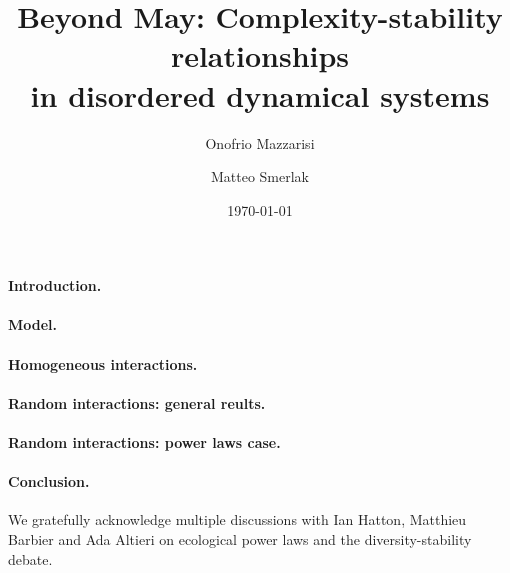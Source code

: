 \documentclass[
 prl,
 twocolumn,
 amsmath,
 amssymb,
 aps,
]{revtex4-2}
\begin{document}
\title{Beyond May: Complexity-stability relationships \\
in disordered dynamical systems}

\author{Onofrio Mazzarisi}

\author{Matteo Smerlak}


\date{\today}

\begin{abstract}

\end{abstract}
\maketitle

\paragraph*{\bf Introduction.}


\paragraph*{\bf Model.}


\paragraph*{\bf Homogeneous interactions.}


\paragraph*{\bf Random interactions: general reults.}

\paragraph*{\bf Random interactions: power laws case.}


\paragraph*{\bf Conclusion.}


\begin{acknowledgments}
We gratefully acknowledge multiple discussions with Ian Hatton, Matthieu Barbier and Ada Altieri on ecological power laws and the diversity-stability debate. 
\end{acknowledgments}

\clearpage



\end{document}
